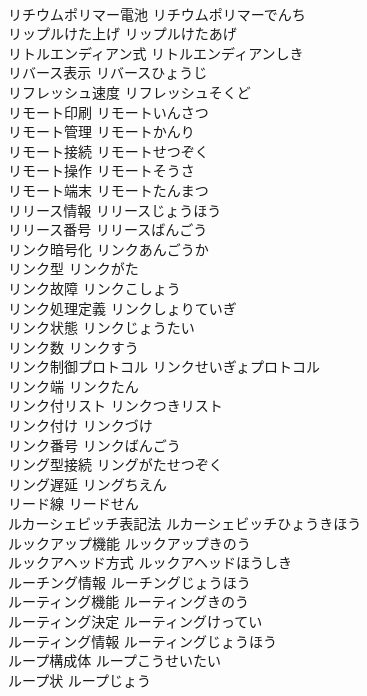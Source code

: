 \documentclass[8pt]{extreport}
\begin{document}
\begin{CJK}{UTF8}{min}
\\	リチウムポリマー電池	リチウムポリマーでんち	
\\	リップルけた上げ	リップルけたあげ	
\\	リトルエンディアン式	リトルエンディアンしき	
\\	リバース表示	リバースひょうじ	
\\	リフレッシュ速度	リフレッシュそくど	
\\	リモート印刷	リモートいんさつ	
\\	リモート管理	リモートかんり	
\\	リモート接続	リモートせつぞく	
\\	リモート操作	リモートそうさ	
\\	リモート端末	リモートたんまつ	
\\	リリース情報	リリースじょうほう	
\\	リリース番号	リリースばんごう	
\\	リンク暗号化	リンクあんごうか	
\\	リンク型	リンクがた	
\\	リンク故障	リンクこしょう	
\\	リンク処理定義	リンクしょりていぎ	
\\	リンク状態	リンクじょうたい	
\\	リンク数	リンクすう	
\\	リンク制御プロトコル	リンクせいぎょプロトコル	
\\	リンク端	リンクたん	
\\	リンク付リスト	リンクつきリスト	
\\	リンク付け	リンクづけ	
\\	リンク番号	リンクばんごう	
\\	リング型接続	リングがたせつぞく	
\\	リング遅延	リングちえん	
\\	リード線	リードせん	
\\	ルカーシェビッチ表記法	ルカーシェビッチひょうきほう	
\\	ルックアップ機能	ルックアップきのう	
\\	ルックアヘッド方式	ルックアヘッドほうしき	
\\	ルーチング情報	ルーチングじょうほう	
\\	ルーティング機能	ルーティングきのう	
\\	ルーティング決定	ルーティングけってい	
\\	ルーティング情報	ルーティングじょうほう	
\\	ループ構成体	ループこうせいたい	
\\	ループ状	ループじょう	

\end{CJK}
\end{document}
